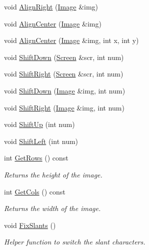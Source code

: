 \begin{DoxyCompactItemize}
\item 
void \hyperlink{classImage_a171b44f5d1ac53bfa9984a87c9786dd1}{Align\-Right} (\hyperlink{classImage}{Image} \&img)
\item 
void \hyperlink{classImage_a7471581b8a028a79fd87d741ae825e23}{Align\-Center} (\hyperlink{classImage}{Image} \&img)
\item 
void \hyperlink{classImage_a4607fa422c54fb4bf0412edd47214b40}{Align\-Center} (\hyperlink{classImage}{Image} \&img, int x, int y)
\item 
void \hyperlink{classImage_aed099dcc3c5113b7171daa35460df948}{Shift\-Down} (\hyperlink{classScreen}{Screen} \&scr, int num)
\item 
void \hyperlink{classImage_a1dc60415fb8f71c1c9345382be4ee32f}{Shift\-Right} (\hyperlink{classScreen}{Screen} \&scr, int num)
\item 
void \hyperlink{classImage_ad3fec1f163c82a6dc376e1727e42de30}{Shift\-Down} (\hyperlink{classImage}{Image} \&img, int num)
\item 
void \hyperlink{classImage_ae905765bb51e09a8252dcb157b2bcf28}{Shift\-Right} (\hyperlink{classImage}{Image} \&img, int num)
\item 
void \hyperlink{classImage_a8b15a9bbf2a56bd2105bbc1114bba173}{Shift\-Up} (int num)
\item 
void \hyperlink{classImage_a1bc3f79eeff5bfcc430299cb149071f5}{Shift\-Left} (int num)
\item 
int \hyperlink{classImage_a91b5bb5c3fef2795ec9838763536ed78}{Get\-Rows} () const 
\begin{DoxyCompactList}\small\item\em Returns the height of the image. \end{DoxyCompactList}\item 
int \hyperlink{classImage_a5377ce45ff29db084776e675b413f165}{Get\-Cols} () const 
\begin{DoxyCompactList}\small\item\em Returns the width of the image. \end{DoxyCompactList}\item 
void \hyperlink{classImage_a5c723d560bde4b6aa45f3eaa36ffb4f2}{Fix\-Slants} ()
\begin{DoxyCompactList}\small\item\em Helper function to switch the slant characters. \end{DoxyCompactList}\end{DoxyCompactItemize}

